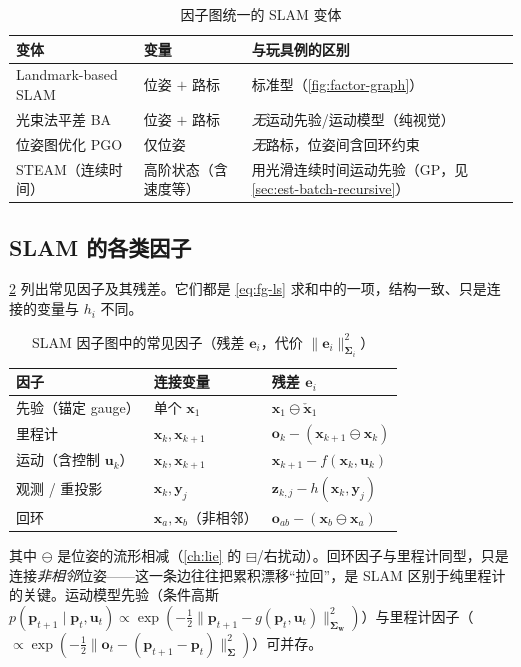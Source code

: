 \begin{table}[ht]\centering\small
\caption{因子图统一的 SLAM 变体}
\label{tab:est-slam-variants}
\begin{tabular}{lll}
\toprule
变体 & 变量 & 与玩具例的区别 \\
\midrule
Landmark-based SLAM & 位姿 $+$ 路标 & 标准型（\cref{fig:factor-graph}） \\
光束法平差 BA & 位姿 $+$ 路标 & \emph{无}运动先验/运动模型（纯视觉） \\
位姿图优化 PGO & 仅位姿 & \emph{无}路标，位姿间含回环约束 \\
STEAM（连续时间） & 高阶状态（含速度等） & 用光滑连续时间运动先验（GP，见 \cref{sec:est-batch-recursive}） \\
\bottomrule
\end{tabular}
\end{table}

\subsection{SLAM 的各类因子}
\label{sec:est-factors}

\cref{tab:factors} 列出常见因子及其残差。它们都是 \cref{eq:fg-ls} 求和中的一项，结构一致、只是连接的变量与 $h_i$ 不同。

\begin{table}[ht]\centering\small
\caption{SLAM 因子图中的常见因子（残差 $\mathbf{e}_i$，代价 $\|\mathbf{e}_i\|_{\boldsymbol{\Sigma}_i}^2$）}
\label{tab:factors}
\begin{tabular}{lll}
\toprule
因子 & 连接变量 & 残差 $\mathbf{e}_i$ \\
\midrule
先验（锚定 gauge） & 单个 $\mathbf{x}_1$ & $\mathbf{x}_1\ominus\check{\mathbf{x}}_1$ \\
里程计 & $\mathbf{x}_k,\mathbf{x}_{k+1}$ & $\mathbf{o}_k-(\mathbf{x}_{k+1}\ominus\mathbf{x}_k)$ \\
运动（含控制 $\mathbf{u}_k$） & $\mathbf{x}_k,\mathbf{x}_{k+1}$ & $\mathbf{x}_{k+1}-f(\mathbf{x}_k,\mathbf{u}_k)$ \\
观测 / 重投影 & $\mathbf{x}_k,\mathbf{y}_j$ & $\mathbf{z}_{k,j}-h(\mathbf{x}_k,\mathbf{y}_j)$ \\
回环 & $\mathbf{x}_a,\mathbf{x}_b$（非相邻） & $\mathbf{o}_{ab}-(\mathbf{x}_b\ominus\mathbf{x}_a)$ \\
\bottomrule
\end{tabular}
\end{table}

\noindent 其中 $\ominus$ 是位姿的流形相减（\cref{ch:lie} 的 $\boxminus$/右扰动）。回环因子与里程计同型，只是连接\emph{非相邻}位姿——这一条边往往把累积漂移“拉回”，是 SLAM 区别于纯里程计的关键。运动模型先验（条件高斯 $p(\mathbf{p}_{t+1}\mid\mathbf{p}_t,\mathbf{u}_t)\propto\exp(-\tfrac12\|\mathbf{p}_{t+1}-g(\mathbf{p}_t,\mathbf{u}_t)\|_{\boldsymbol{\Sigma}_{\mathbf{w}}}^2)$）与里程计因子（$\propto\exp(-\tfrac12\|\mathbf{o}_t-(\mathbf{p}_{t+1}-\mathbf{p}_t)\|_{\boldsymbol{\Sigma}}^2)$）可并存\cite{carlone2026handbook}。

